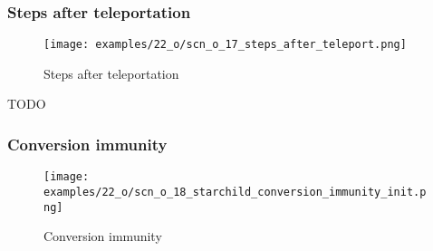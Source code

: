 \clearpage %

\subsubsection*{Steps after teleportation}

\vspace*{-1.4\baselineskip}
\noindent
\begin{figure}[!h]
\texttt{[image: examples/22\_o/scn\_o\_17\_steps\_after\_teleport.png]}
\caption{Steps after teleportation}
\label{fig:scn_o_17_steps_after_teleport}
\end{figure}

\huge
TODO
\normalsize





\clearpage %

\subsubsection*{Conversion immunity}

\vspace*{-0.9\baselineskip}
\noindent
\begin{figure}[!h]
\texttt{[image: examples/22\_o/scn\_o\_18\_starchild\_conversion\_immunity\_init.png]}
\caption{Conversion immunity}
\label{fig:scn_o_18_starchild_conversion_immunity_init}
\end{figure}


